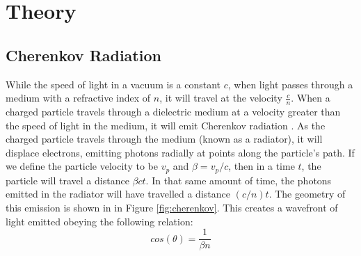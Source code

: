 
\chapter{Theory}
\label{ch:Theory}

\section{Cherenkov Radiation}
\label{sec:cherenkov}
While the speed of light in a vacuum is a constant $c$, when light passes through a medium with a refractive index of $n$, it will travel at the velocity $\frac{c}{n}$.
When a charged particle travels through a dielectric medium at a velocity greater than the speed of light in the medium, it will emit Cherenkov radiation \cite{cherenkov}.
As the charged particle travels through the medium (known as a radiator), it will displace electrons, emitting photons radially at points along the particle's path.
If we define the particle velocity to be $v_p$ and $\beta = v_p / c$, then in a time $t$, the particle will travel a distance $\beta ct$.
In that same amount of time, the photons emitted in the radiator will have travelled a distance $(c/n)t$.
The geometry of this emission is shown in in Figure \ref{fig:cherenkov}.
This creates a wavefront of light emitted obeying the following relation:
\begin{equation}
    cos(\theta) = \frac{1}{\beta n}
    \label{eq:cherenkovAngle}
\end{equation}

